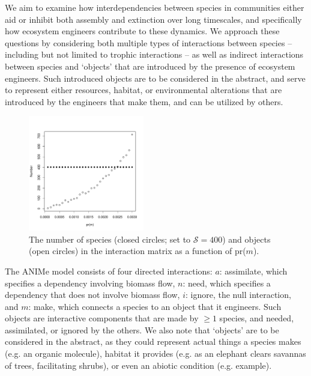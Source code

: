 \documentclass[twocolumn,preprintnumbers,amsmath,amssymb,superscriptaddress]{revtex4}
\begin{document}
We aim to examine how interdependencies between species in communities either aid or inhibit both assembly and extinction over long timescales, and specifically how ecosystem engineers contribute to these dynamics.
We approach these questions by considering both multiple types of interactions between species -- including but not limited to trophic interactions --  as well as indirect interactions between species and `objects' that are introduced by the presence of ecosystem engineers.
Such introduced objects are to be considered in the abstract, and serve to represent either resources, habitat, or environmental alterations that are introduced by the engineers that make them, and can be utilized by others. 




\begin{figure}
\centering
\includegraphics[width=0.45\textwidth]{fig_spob.pdf}
\caption{
The number of species (closed circles; set to $\mathcal S=400$) and objects (open circles) in the interaction matrix as a function of pr($m$).
}
\label{fig_spob}
\end{figure} 


The ANIMe model consists of four directed interactions:
$a$: assimilate, which specifies a dependency involving biomass flow,
$n$: need, which specifies a dependency that does not involve biomass flow,
$i$: ignore, the null interaction, and
$m$: make, which connects a species to an object that it engineers. Such objects are interactive components that are made by $\geq 1$ species, and needed, assimilated, or ignored by the others.
We also note that `objects' are to be considered in the abstract, as they could represent actual things a species makes (e.g. an organic molecule), habitat it provides (e.g. as an elephant clears savannas of trees, facilitating shrubs), or even an abiotic condition (e.g. example). 
\end{document}
